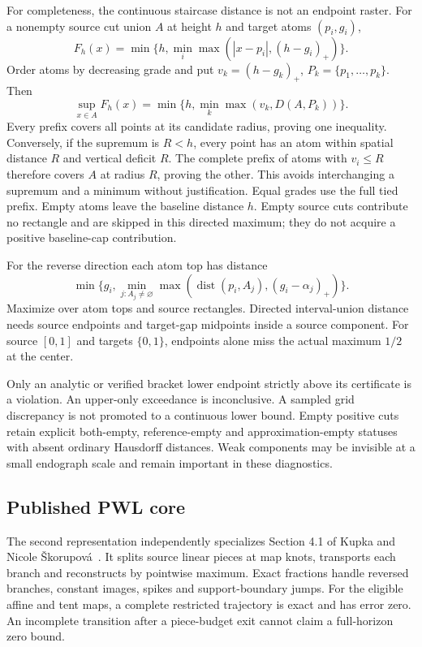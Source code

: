 \documentclass[10pt,a4paper]{article}
\newcommand{\dist}{\operatorname{dist}}
\begin{document}
For completeness, the continuous staircase distance is not an endpoint raster.
For a nonempty source cut union $A$ at height $h$ and target atoms $(p_i,g_i)$,
\[
 F_h(x)=\min\{h,\min_i\max(|x-p_i|,(h-g_i)_+)\}.
\]
Order atoms by decreasing grade and put $v_k=(h-g_k)_+$,
$P_k=\{p_1,\ldots,p_k\}$. Then
\begin{equation}
 \sup_{x\in A}F_h(x)=\min\{h,\min_k\max(v_k,D(A,P_k))\}.
\end{equation}
Every prefix covers all points at its candidate radius, proving one inequality.
Conversely, if the supremum is $R<h$, every point has an atom within spatial
distance $R$ and vertical deficit $R$. The complete prefix of atoms with
$v_i\leq R$ therefore covers $A$ at radius $R$, proving the other. This avoids
interchanging a supremum and a minimum without justification. Equal grades
use the full tied prefix. Empty atoms leave the baseline distance $h$.
Empty source cuts contribute no rectangle and are skipped in this directed
maximum; they do not acquire a positive baseline-cap contribution.

For the reverse direction each atom top has distance
\[
 \min\{g_i,\min_{j:A_j\ne\varnothing}
       \max(\dist(p_i,A_j),(g_i-\alpha_j)_+)\}.
\]
Maximize over atom tops and source rectangles. Directed interval-union
distance needs source endpoints and target-gap midpoints inside a source
component. For source $[0,1]$ and targets $\{0,1\}$, endpoints alone miss
the actual maximum $1/2$ at the center.

Only an analytic or verified bracket lower endpoint strictly above its
certificate is a violation. An upper-only exceedance is inconclusive. A sampled
grid discrepancy is not promoted to a continuous lower bound. Empty positive
cuts retain explicit both-empty, reference-empty and approximation-empty
statuses with absent ordinary Hausdorff distances. Weak components may be
invisible at a small endograph scale and remain important in these diagnostics.

\subsection{Published PWL core}
The second representation independently specializes Section 4.1 of Kupka and
Nicole Škorupová~\cite{pwl}. It splits source linear pieces at map knots,
transports each branch and reconstructs by pointwise maximum. Exact fractions
handle reversed branches, constant images, spikes and support-boundary jumps.
For the eligible affine and tent maps, a complete restricted trajectory is
exact and has error zero. An incomplete transition after a piece-budget exit
cannot claim a full-horizon zero bound.
\end{document}
